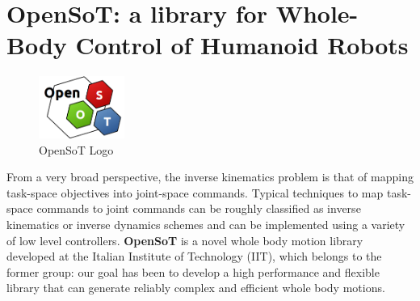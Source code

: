 \section{OpenSoT: a library for Whole-Body Control of Humanoid Robots}
\begin{figure}
  \begin{center}
    \includegraphics[width=0.25\textwidth]{images/openSoT_stickers}
  \end{center}
  \caption{OpenSoT Logo}
\end{figure}
From a very broad perspective, the inverse kinematics problem is that of mapping task-space objectives into joint-space commands.
Typical techniques to map task-space commands to joint commands can be roughly classified as inverse kinematics or inverse dynamics schemes and can be implemented using a variety of low level controllers.
\textbf{OpenSoT} is a novel whole body motion library developed at the Italian Institute of Technology (IIT), which belongs to the former group: our goal has been to develop a high performance and flexible library that can generate reliably complex and efficient whole body motions.

